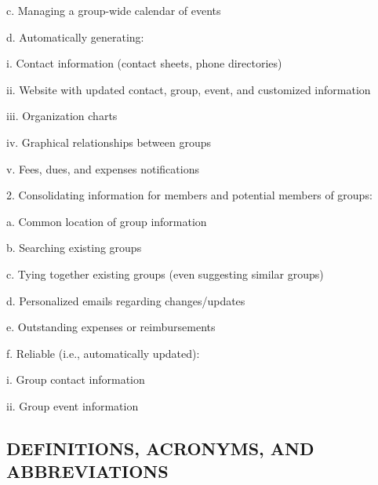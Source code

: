 \documentclass[letterpaper]{article}
\newcommand\textstyleDefaultParagraphFont[1]{#1}
\begin{document}
{\color{black}
\textstyleDefaultParagraphFont{c. Managing a group-wide calendar of
events}}

{\color{black}
\textstyleDefaultParagraphFont{d. Automatically generating:}}

{\color{black}
\textstyleDefaultParagraphFont{i. Contact information (contact sheets,
phone directories)}}

{\color{black}
\textstyleDefaultParagraphFont{ii. Website with updated contact, group,
event, and customized information}}

{\color{black}
\textstyleDefaultParagraphFont{iii. Organization charts}}

{\color{black}
\textstyleDefaultParagraphFont{iv. Graphical relationships between
groups}}

{\color{black}
\textstyleDefaultParagraphFont{v. Fees, dues, and expenses
notifications}}

{\color{black}
\textstyleDefaultParagraphFont{2. Consolidating information for members
and potential members of groups:}}

{\color{black}
\textstyleDefaultParagraphFont{a. Common location of group information}}

{\color{black}
\textstyleDefaultParagraphFont{b. Searching existing groups}}

{\color{black}
\textstyleDefaultParagraphFont{c. Tying together existing groups (even
suggesting similar groups)}}

{\color{black}
\textstyleDefaultParagraphFont{d. Personalized emails regarding
changes/updates}}

{\color{black}
\textstyleDefaultParagraphFont{e. Outstanding expenses or
reimbursements}}

{\color{black}
\textstyleDefaultParagraphFont{f. Reliable (i.e., automatically
updated):}}

{\color{black}
\textstyleDefaultParagraphFont{i. Group contact information}}

{\color{black}
\textstyleDefaultParagraphFont{ii. Group event information}}

\subsection[DEFINITIONS, ACRONYMS, AND ABBREVIATIONS]{\rmfamily
DEFINITIONS, ACRONYMS, AND ABBREVIATIONS}

\bigskip
\end{document}
